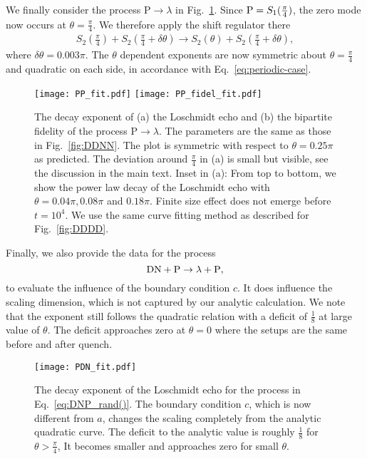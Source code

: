 We finally consider the process $\text{P} \rightarrow \lambda$
in Fig.~\ref{fig:PPPP}. Since ${\rm P} = S_1( \frac{\pi}{4} ) $, the zero mode now occurs at $\theta = \frac{\pi}{4}$. We therefore apply the shift regulator there 
\begin{equation}
\begin{aligned}
\label{eq:approx_PPPP}
S_2\left(\frac{\pi}{4}\right)+S_2\left(\frac{\pi}{4}+\delta\theta\right)\rightarrow S_2(\theta)+S_2\left(\frac{\pi}{4}+\delta\theta\right),
\end{aligned}
\end{equation}
where $\delta\theta=0.003\pi$. The $\theta$ dependent exponents are now symmetric about $\theta=\frac{\pi}{4}$ and quadratic on each side, in accordance with Eq.~\eqref{eq:periodic-case}.

\begin{figure}
  \centering
  \texttt{[image: PP\_fit.pdf]}
    \texttt{[image: PP\_fidel\_fit.pdf]}
    \caption{The decay exponent of (a) the Loschmidt echo and (b) the bipartite fidelity of the process $\text{P} \rightarrow \lambda$.{\iffalse in Eq.~\eqref{eq:PP}\fi} The parameters are the same as those in Fig.~\ref{fig:DDNN}. The plot is symmetric with respect to $\theta=0.25\pi$ as predicted. The deviation around $\frac{\pi}{4}$ in (a) is small but visible, see the discussion in the main text. Inset in (a): From top to bottom, we show the power law decay of the Loschmidt echo with $\theta=0.04\pi, 0.08\pi $ and $0.18\pi$. Finite size effect does not emerge before $t=10^{4}$. We use the same curve fitting method as described for Fig.~\ref{fig:DDDD}.}
    \label{fig:PPPP}
\end{figure}

Finally, we also provide the data for the process
\begin{equation}
\label{eq:DNP_rand()}
{\rm DN} + {\rm P} \rightarrow \lambda  + {\rm P},
\end{equation}
to evaluate the influence of the boundary condition $c$. It {\rm does} influence the scaling dimension, which is not captured by our analytic calculation. We note that the exponent still follows the quadratic relation with a deficit of $\frac{1}{8}$ at large value of $\theta$. The deficit approaches zero at $\theta=0$ where the setups are the same before and after quench.
\begin{figure}[htb]
\centering
\texttt{[image: PDN\_fit.pdf]}
\caption{The decay exponent of the Loschmidt echo for the process in Eq.~\eqref{eq:DNP_rand()}. The boundary condition $c$, which is now different from $a$, changes the scaling completely from the analytic quadratic curve. The deficit to the analytic value is roughly $\frac{1}{8}$ for $\theta > \frac{\pi}{4}$, It becomes smaller and approaches zero for small $\theta$.}
\label{fig:PDN_fit}
\end{figure}

